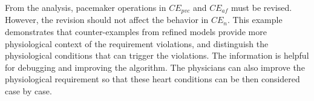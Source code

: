 From the analysis, pacemaker operations in $CE_{pvc}$ and $CE_{af}$ must be revised. However, the revision should not affect the behavior in $CE_{n}$. This example demonstrates that counter-examples from refined models provide more physiological context of the requirement violations, and distinguish the physiological conditions that can trigger the violations. The information is helpful for debugging and improving the algorithm. The physicians can also improve the physiological requirement so that these heart conditions can be then considered case by case.
